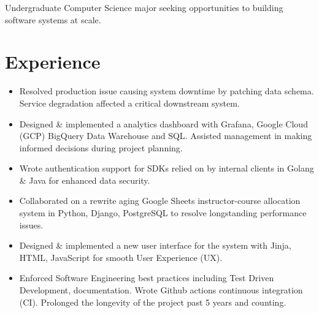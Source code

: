 %
%


\fancyhead{} %


Undergraduate Computer Science major seeking opportunities to building software systems at scale.

\section{Experience}
\begin{itemize}
    \item Resolved production issue causing system downtime by patching data schema. Service degradation affected a critical downstream system.
    \item 
        Designed \& implemented a analytics dashboard with Grafana, Google Cloud (GCP) BigQuery Data Warehouse and SQL. Assisted management in making informed decisions during project planning.
    \item Wrote authentication support for SDKs relied on by internal clients in Golang \& Java for enhanced data security.
\end{itemize}

\begin{itemize}
  \item Collaborated on a rewrite aging Google Sheets instructor-course allocation system in Python, Django, PostgreSQL to 
    resolve longstanding performance issues. 
  \item Designed \& implemented a new user interface 
    for the system with Jinja, HTML, JavaScript for smooth User Experience (UX).
  \item Enforced Software Engineering best practices including Test Driven Development,
    documentation. Wrote Github actions continuous integration (CI). 
    Prolonged the longevity of the project past 5 years and counting.
\end{itemize}



